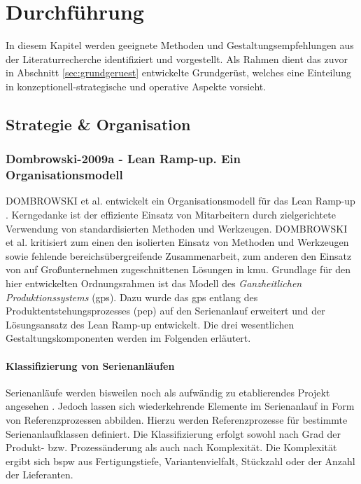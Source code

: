 
\chapter{Durchführung}\label{sec:durchfuehrung}
In diesem Kapitel werden geeignete Methoden und Gestaltungsempfehlungen aus der Literaturrecherche identifiziert und vorgestellt. Als Rahmen dient das zuvor in Abschnitt \ref{sec:grundgeruest}
entwickelte Grundgerüst, welches eine Einteilung in konzeptionell-strategische und operative Aspekte vorsieht. 

\section{Strategie \& Organisation}

\subsection*{Dombrowski-2009a - Lean Ramp-up. Ein Organisationsmodell}\label{dom09}

DOMBROWSKI et al. entwickelt ein Organisationsmodell für das Lean Ramp-up \autocite{Dombrowski2009}. Kerngedanke ist der effiziente Einsatz von Mitarbeitern durch zielgerichtete Verwendung von standardisierten Methoden und Werkzeugen. DOMBROWSKI et al. kritisiert zum einen den isolierten Einsatz von Methoden und Werkzeugen sowie fehlende bereichsübergreifende Zusammenarbeit, zum anderen den Einsatz von auf Großunternehmen zugeschnittenen Lösungen in \gls{kmu}. 
Grundlage für den hier entwickelten Ordnungsrahmen ist das Modell des \textit{Ganzheitlichen Produktionssystems} (\gls{gps}). Dazu wurde das \gls{gps} entlang des Produktentstehungsprozesses (\gls{pep}) auf den Serienanlauf erweitert und der Lösungsansatz des Lean Ramp-up entwickelt. Die drei wesentlichen Gestaltungskomponenten werden im Folgenden erläutert. 

\subsubsection{Klassifizierung von Serienanläufen}
Serienanläufe werden bisweilen noch als aufwändig zu etablierendes Projekt angesehen \autocite{Kuhn2002}. Jedoch lassen sich wiederkehrende Elemente im Serienanlauf in Form von Referenzprozessen abbilden. Hierzu werden Referenzprozesse für bestimmte Serienanlaufklassen definiert. Die Klassifizierung erfolgt sowohl nach Grad der Produkt- bzw. Prozessänderung \autocite{Kuhn2002, Hertrampf2008} als auch nach Komplexität.
Die Komplexität ergibt sich \gls{bspw} aus Fertigungstiefe, Variantenvielfalt, Stückzahl oder der Anzahl der Lieferanten.


